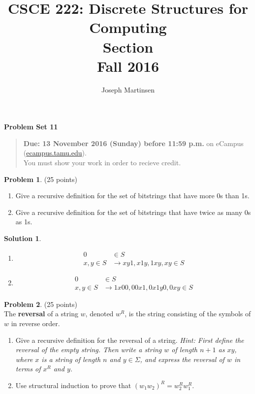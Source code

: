 \documentclass{article}
\title{CSCE 222: Discrete Structures for Computing\\Section \mysectionnumber\\Fall 2016}
\author{Joseph Martinsen}
\theoremstyle{definition}
\newtheorem{problem}{Problem}
\newtheorem*{solution}{Solution}
\newcommand{\problemset}[1]{\begin{center}\textbf{Problem Set #1}\end{center}}
\newcommand{\duedate}[1]{\begin{quote}\textbf{Due: #1} on eCampus (\url{ecampus.tamu.edu}). \\You must show your work in order to recieve credit.\end{quote}}
\begin{document}
\maketitle

\problemset{11}

\duedate{13 November 2016 (Sunday) before 11:59 p.m.}

\bigskip

\begin{problem} (25 points)
\begin{enumerate}
\item Give a recursive definition for the set of bitstrings that have more 0s than 1s.
\item Give a recursive definition for the set of bitstrings that have twice as many 0s as 1s.
\end{enumerate}

\end{problem}

\begin{solution}\ \\
\begin{enumerate}
  \item 
  \begin{align*}
    0 &\in S \\
    x,y \in S &\rightarrow xy1, x1y, 1xy,xy \in S
  \end{align*}
  \item
    \begin{align*}
    0 &\in S \\
    x,y \in S &\rightarrow 1x00, 00x1, 0x1y0,0xy \in S
  \end{align*}
\end{enumerate}
\end{solution}

\newpage

\begin{problem} (25 points)\\
The \textbf{reversal} of a string $w$, denoted $w^R$, is the string consisting of the symbols of $w$ in reverse order.
\begin{enumerate}
\item Give a recursive definition for the reversal of a string. \textit{Hint: First define the reversal of the empty string.  Then write a string $w$ of length $n+1$ as $xy$, where $x$ is a string of length $n$ and $y\in\Sigma$, and express the reversal of $w$ in terms of $x^R$ and $y$.}
\item Use structural induction to prove that $(w_1w_2)^R = w_2^Rw_1^R$.
\end{enumerate}
\end{problem}
\end{document}
